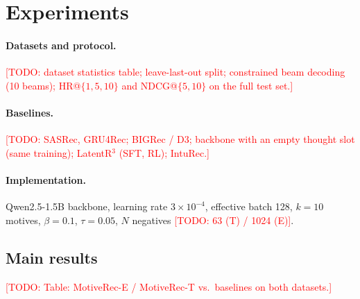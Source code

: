 \documentclass[10pt,twocolumn]{article}
\newcommand{\todo}[1]{\textcolor{red}{[TODO: #1]}}
\begin{document}
\section{Experiments}\label{sec:exp}
\paragraph{Datasets and protocol.} \todo{dataset statistics table; leave-last-out split; constrained beam
decoding (10 beams); HR@$\{1,5,10\}$ and NDCG@$\{5,10\}$ on the full test set.}

\paragraph{Baselines.} \todo{SASRec, GRU4Rec; BIGRec / D3; backbone with an empty thought slot
(same training); LatentR$^3$ (SFT, RL); IntuRec.}

\paragraph{Implementation.} Qwen2.5-1.5B backbone, learning rate $3\times10^{-4}$, effective batch 128,
$k=10$ motives, $\beta=0.1$, $\tau=0.05$, $N$ negatives \todo{63 (T) / 1024 (E)}.

\subsection{Main results}
\todo{Table: MotiveRec-E / MotiveRec-T vs.\ baselines on both datasets.}
\end{document}

